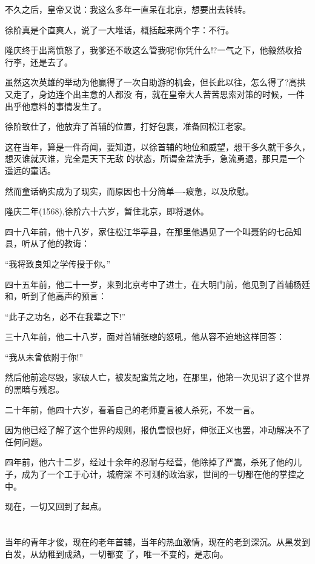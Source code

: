 \documentclass[11pt,a4paper,onecolumn]{article}
\begin{document}
不久之后，皇帝又说：我这么多年一直呆在北京，想要出去转转。

徐阶真是个直爽人，说了一大堆话，概括起来两个字：不行。

隆庆终于出离愤怒了，我爹还不敢这么管我呢!你凭什么!?一气之下，他毅然收拾行李，还是去了。

虽然这次英雄的举动为他赢得了一次自助游的机会，但长此以往，怎么得了?高拱又走了，身边连个出主意的人都没
有，就在皇帝大人苦苦思索对策的时候，一件出乎他意料的事情发生了。

徐阶致仕了，他放弃了首辅的位置，打好包裹，准备回松江老家。

这在当年，算是一件奇闻，要知道，以徐首辅的地位和威望，想干多久就干多久，想灭谁就灭谁，完全是天下无敌
的状态，所谓金盆洗手，急流勇退，那只是一个遥远的童话。

然而童话确实成为了现实，而原因也十分简单----疲惫，以及欣慰。

隆庆二年(1568),徐阶六十六岁，暂住北京，即将退休。

四十八年前，他十八岁，家住松江华亭县，在那里他遇见了一个叫聂豹的七品知县，听从了他的教诲：

``我将致良知之学传授于你。''

四十五年前，他二十一岁，来到北京考中了进士，在大明门前，他见到了首辅杨廷和，听到了他高声的预言：

``此子之功名，必不在我辈之下!''

三十八年前，他二十八岁，面对首辅张璁的怒吼，他从容不迫地这样回答：

``我从未曾依附于你!''

然后他前途尽毁，家破人亡，被发配蛮荒之地，在那里，他第一次见识了这个世界的黑暗与残忍。

二十年前，他四十六岁，看着自己的老师夏言被人杀死，不发一言。

因为他已经了解了这个世界的规则，报仇雪恨也好，伸张正义也罢，冲动解决不了任何问题。

四年前，他六十二岁，经过十余年的忍耐与经营，他除掉了严嵩，杀死了他的儿子，成为了一个工于心计，城府深
不可测的政治家，世间的一切都在他的掌控之中。

现在，一切又回到了起点。

\section[\thesection]{}

当年的青年才俊，现在的老年首辅，当年的热血激情，现在的老到深沉。从黑发到白发，从幼稚到成熟，一切都变
了，唯一不变的，是志向。
\end{document}
